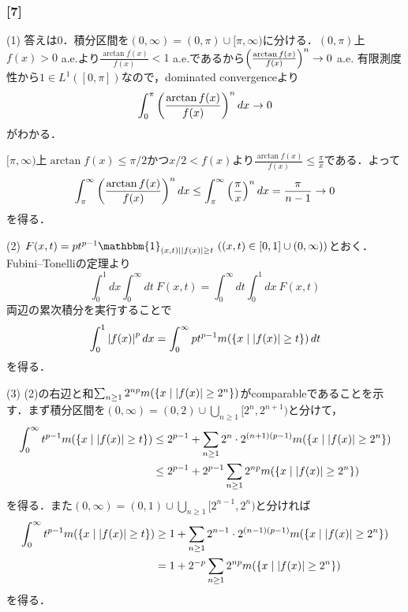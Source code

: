 \documentclass[a4j]{ltjsarticle}
\newcommand{\1}{\mathbbm{1}}
\numberwithin{equation}{section}
\theoremstyle{definition}
\begin{document}
\subsubsection*{[7]}
(1) 答えは0．積分区間を$(0,\infty)=(0,\pi)\cup[\pi,\infty)$に分ける．$(0,\pi)$上$f(x)>0$ a.e.より$\frac{\arctan f(x)}{f(x)}<1$ a.e.であるから$\qty(\frac{\arctan f(x)}{f(x)})^n\to0$ a.e. 有限測度性から$1\in L^1([0,\pi])$なので，dominated convergenceより
\begin{equation}
    \int_{0}^{\pi}\qty(\frac{\arctan f(x)}{f(x)})^n\,dx\to0 
\end{equation}
がわかる．

$[\pi,\infty)$上$\arctan f(x)\leq \pi/2$かつ$x/2<f(x)$より$\frac{\arctan f(x)}{f(x)}\leq \frac{\pi}{x}$である．よって
\begin{equation}
    \int_{\pi}^{\infty}\qty(\frac{\arctan f(x)}{f(x)})^n\,dx\leq\int_{\pi}^{\infty}\qty(\frac{\pi}{x})^n\,dx=\frac{\pi}{n-1}\to0
\end{equation}
を得る．

(2) $F(x,t)=pt^{p-1}\1_{\qty(x,t)\mid \abs{f(x)}\geq t}\ ((x,t)\in [0,1]\cup(0,\infty))$とおく．Fubini--Tonelliの定理より
\begin{equation}
    \int_{0}^{1}dx\int_{0}^{\infty}dt\ F(x,t)=\int_{0}^{\infty}dt\int_{0}^{1}dx\ F(x,t)
\end{equation}
両辺の累次積分を実行することで
\begin{equation}
    \int_{0}^{1}\abs{f(x)}^p\,dx=\int_{0}^{\infty}pt^{p-1}m(\qty{x\mid \abs{f(x)}\geq t})\,dt
\end{equation}
を得る．

(3) (2)の右辺と和$\sum_{n\geq 1}2^{np}m(\qty{x\mid \abs{f(x)}\geq 2^n})$がcomparableであることを示す．まず積分区間を$(0,\infty)=(0,2)\cup\bigcup_{n\geq 1}[2^n,2^{n+1})$と分けて，
\begin{align}
    \int_{0}^{\infty}t^{p-1}m(\qty{x\mid \abs{f(x)}\geq t})&\leq 2^{p-1}+\sum_{n\geq 1}2^n\cdot 2^{(n+1)(p-1)}m\qty(\qty{x\mid \abs{f(x)}\geq 2^n})\\
    &\leq 2^{p-1}+2^{p-1}\sum_{n\geq 1}2^{np}m(\qty{x\mid \abs{f(x)}\geq 2^n})
\end{align}
を得る．また$(0,\infty)=(0,1)\cup\bigcup_{n\geq 1}[2^{n-1},2^n)$と分ければ
\begin{align}
    \int_{0}^{\infty}t^{p-1}m(\qty{x\mid \abs{f(x)}\geq t})&\geq 1+\sum_{n\geq 1}2^{n-1}\cdot 2^{(n-1)(p-1)}m(\qty{x\mid \abs{f(x)}\geq 2^n})\\
    &=1+2^{-p}\sum_{n\geq 1}2^{np}m(\qty{x\mid \abs{f(x)}\geq 2^n})
\end{align}
を得る．
\end{document}
